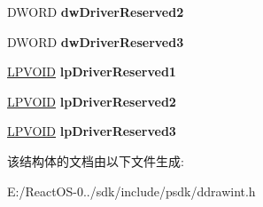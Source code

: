 \begin{DoxyCompactItemize}
\mbox{\label{struct_d_d___m_o_t_i_o_n_c_o_m_p___l_o_c_a_l_a0d19e4c26c1945f9984e7507e9fff326}} 
D\+W\+O\+RD {\bfseries dw\+Driver\+Reserved2}
\item 
\mbox{\label{struct_d_d___m_o_t_i_o_n_c_o_m_p___l_o_c_a_l_a68c8d5625f6b873d7b3eb9bd26ddade9}} 
D\+W\+O\+RD {\bfseries dw\+Driver\+Reserved3}
\item 
\mbox{\label{struct_d_d___m_o_t_i_o_n_c_o_m_p___l_o_c_a_l_af694105edc17dc44feb9b26e16735ff1}} 
\hyperlink{interfacevoid}{L\+P\+V\+O\+ID} {\bfseries lp\+Driver\+Reserved1}
\item 
\mbox{\label{struct_d_d___m_o_t_i_o_n_c_o_m_p___l_o_c_a_l_a792266a6cb86798b3a369ac0838a83ad}} 
\hyperlink{interfacevoid}{L\+P\+V\+O\+ID} {\bfseries lp\+Driver\+Reserved2}
\item 
\mbox{\label{struct_d_d___m_o_t_i_o_n_c_o_m_p___l_o_c_a_l_aea9224a9c06b8ac29c153a707d92211a}} 
\hyperlink{interfacevoid}{L\+P\+V\+O\+ID} {\bfseries lp\+Driver\+Reserved3}
\end{DoxyCompactItemize}


该结构体的文档由以下文件生成\+:\begin{DoxyCompactItemize}
\item 
E\+:/\+React\+O\+S-\/0../sdk/include/psdk/ddrawint.\+h\end{DoxyCompactItemize}
